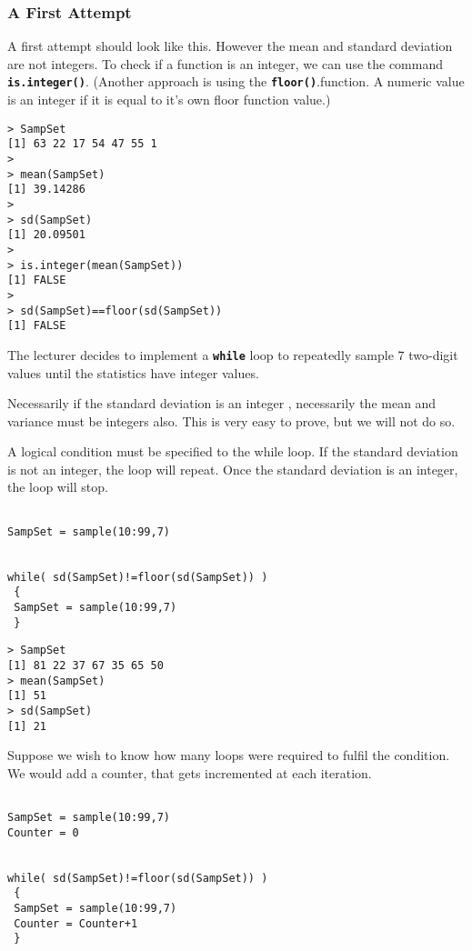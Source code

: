 \documentclass[a4paper,12pt]{article}
\begin{document}
\subsubsection{A First Attempt}
A first attempt should look like this. However the mean and standard deviation are not integers. To check if a function is an integer, we can use the command
\textbf{\texttt{is.integer()}}. (Another approach is using the \textbf{\texttt{floor()}}.function. A numeric value is an integer if it is equal to it's own floor function value.)
\begin{verbatim}
> SampSet
[1] 63 22 17 54 47 55 1
>
> mean(SampSet)
[1] 39.14286
>
> sd(SampSet)
[1] 20.09501
>
> is.integer(mean(SampSet))
[1] FALSE
>
> sd(SampSet)==floor(sd(SampSet))
[1] FALSE

\end{verbatim}

The lecturer decides to implement a \texttt{\textbf{while}} loop to repeatedly sample 7 two-digit values until the statistics have integer values.

Necessarily if the standard deviation is an integer , necessarily the mean and variance must be integers also. This is very easy to prove, but we will not do so.

A logical condition must be specified to the while loop. If the standard deviation is not an integer, the loop will repeat.
Once the standard deviation is an integer, the loop will stop.

\begin{framed}
\begin{verbatim}

SampSet = sample(10:99,7)


while( sd(SampSet)!=floor(sd(SampSet)) )
 {
 SampSet = sample(10:99,7)
 }

\end{verbatim}
\end{framed}


\begin{verbatim}
> SampSet
[1] 81 22 37 67 35 65 50
> mean(SampSet)
[1] 51
> sd(SampSet)
[1] 21
\end{verbatim}


Suppose we wish to know how many loops were required to fulfil the condition. We would add a counter, that gets incremented at each iteration.

\begin{framed}
\begin{verbatim}

SampSet = sample(10:99,7)
Counter = 0


while( sd(SampSet)!=floor(sd(SampSet)) )
 {
 SampSet = sample(10:99,7)
 Counter = Counter+1
 }

\end{verbatim}
\end{framed}
\newpage
\end{document}
